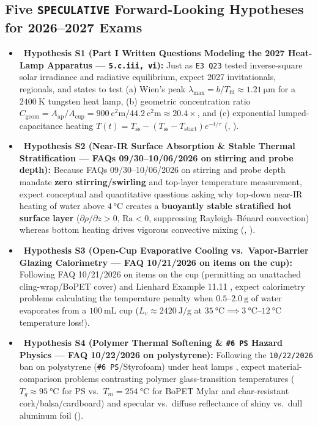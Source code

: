 \subsection{Five \texttt{SPECULATIVE} Forward-Looking Hypotheses for 2026--2027 Exams}
\begin{itemize}
  \item \SPEC\ \textbf{Hypothesis S1 (Part I Written Questions Modeling the 2027 Heat-Lamp Apparatus --- \texttt{5.c.iii, vi}):} Just as \texttt{E3 Q23} tested inverse-square solar irradiance and radiative equilibrium, expect 2027 invitationals, regionals, and states to test (a) Wien's peak $\lambda_{\max} = b / T_{\mathrm{fil}} \approx \SI{1.21}{\micro\meter}$ for a $\SI{2400}{\kelvin}$ tungsten heat lamp, (b) geometric concentration ratio $C_{\mathrm{geom}} = A_{\mathrm{ap}} / A_{\mathrm{cup}} = \SI{900}{\square\centi\meter} / \SI{44.2}{\square\centi\meter} \approx 20.4\times$, and (c) exponential lumped-capacitance heating $T(t) = T_{\mathrm{ss}} - (T_{\mathrm{ss}} - T_{\mathrm{start}})e^{-t/\tau}$ (, ).
  \item \SPEC\ \textbf{Hypothesis S2 (Near-IR Surface Absorption \& Stable Thermal Stratification --- FAQs 09/30--10/06/2026 on stirring and probe depth):} Because FAQs 09/30--10/06/2026 on stirring and probe depth  mandate \textbf{zero stirring/swirling} and top-layer temperature measurement, expect conceptual and quantitative questions asking why top-down near-IR heating of water above $\SI{4}{\celsius}$ creates a \textbf{buoyantly stable stratified hot surface layer} ($\partial\rho/\partial z > 0$, $\mathrm{Ra} < 0$, suppressing Rayleigh--B\'{e}nard convection) whereas bottom heating drives vigorous convective mixing (, ).
  \item \SPEC\ \textbf{Hypothesis S3 (Open-Cup Evaporative Cooling vs.\ Vapor-Barrier Glazing Calorimetry --- FAQ 10/21/2026 on items on the cup):} Following FAQ 10/21/2026 on items on the cup (permitting an unattached cling-wrap/BoPET cover) and Lienhard Example 11.11 , expect calorimetry problems calculating the temperature penalty when $0.5\text{--}\SI{2.0}{\gram}$ of water evaporates from a $\SI{100}{\milli\liter}$ cup ($L_v \approx \SI{2420}{\joule\per\gram}$ at $\SI{35}{\celsius} \implies \SIrange{3}{12}{\celsius}$ temperature loss!).
  \item \SPEC\ \textbf{Hypothesis S4 (Polymer Thermal Softening \& \texttt{\#6 PS} Hazard Physics --- FAQ 10/22/2026 on polystyrene):} Following the \texttt{10/22/2026} ban on polystyrene (\texttt{\#6 PS}/Styrofoam) under heat lamps , expect material-comparison problems contrasting polymer glass-transition temperatures ($T_g \approx \SI{95}{\celsius}$ for PS vs.\ $T_m = \SI{254}{\celsius}$ for BoPET Mylar and char-resistant cork/balsa/cardboard) and specular vs.\ diffuse reflectance of shiny vs.\ dull aluminum foil ().

\end{itemize}

